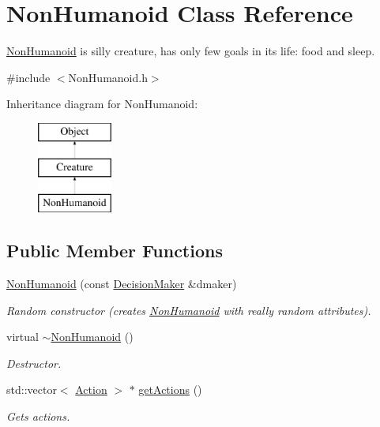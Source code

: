 \hypertarget{classNonHumanoid}{\section{Non\-Humanoid Class Reference}
\label{classNonHumanoid}
}


\hyperlink{classNonHumanoid}{Non\-Humanoid} is silly creature, has only few goals in its life\-: food and sleep.  




{\ttfamily \#include $<$Non\-Humanoid.\-h$>$}

Inheritance diagram for Non\-Humanoid\-:\begin{figure}[H]
\begin{center}
\leavevmode
\includegraphics[height=3.000000cm]{classNonHumanoid}
\end{center}
\end{figure}
\subsection*{Public Member Functions}
\begin{DoxyCompactItemize}
\item 
\hyperlink{classNonHumanoid_aa8442222bc4b7e137bc939ba75a99c73}{Non\-Humanoid} (const \hyperlink{classDecisionMaker}{Decision\-Maker} \&dmaker)
\begin{DoxyCompactList}\small\item\em Random constructor (creates \hyperlink{classNonHumanoid}{Non\-Humanoid} with really random attributes). \end{DoxyCompactList}\item 
virtual \hyperlink{classNonHumanoid_a48709f30b26043f168fa5ebef55014e1}{$\sim$\-Non\-Humanoid} ()
\begin{DoxyCompactList}\small\item\em Destructor. \end{DoxyCompactList}\item 
std\-::vector$<$ \hyperlink{classAction}{Action} $>$ $\ast$ \hyperlink{classNonHumanoid_abc2fe4b8aeaa0a4bf2732fbdcbaf69bc}{get\-Actions} ()
\begin{DoxyCompactList}\small\item\em Gets actions. \end{DoxyCompactList}\end{DoxyCompactItemize}
